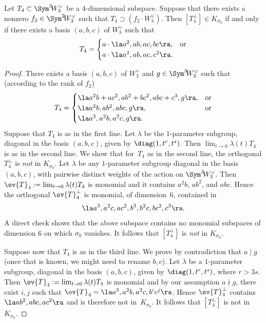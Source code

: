 \begin{prop}\label{gary}
Let $T_4\subset \Sym^3 \!W^{\vee}_3$ be a $4$-dimensional subspace. Suppose that there exists a nonzero $f_2\in\Sym^2\! W_3^{\vee}$ such that $T_4\supset (f_2\cdot W_3^{\vee})$. Then $[T_4^{\bot}]\in K_{\sigma_0}$ if and only if there exists a basis $(a,b,c)$ of $W^{\vee}_3$ such that
\begin{equation}
T_4=
\begin{cases}
a\cdot\la a^2, ab,ac,bc\ra,& \text{or}\\
a\cdot\la a^2,ab,ac,c^2\ra.
\end{cases}
\end{equation}
\end{prop}

\begin{proof}
There exists a basis $(a,b,c)$ of $W^{\vee}_3$ and $g\in\Sym^3 \!W^{\vee}_3$ such that (according to the rank of $f_2$)
\begin{equation}
T_4=
\begin{cases}
\la a^2b +ac^2,ab^2+bc^2,abc+c^3,g\ra,& \text{or}\\
\la a^2b,ab^2,abc,g\ra,& \text{or}\\
\la a^3,a^2b,a^2c,g\ra.
\end{cases}
\end{equation}
Suppose that $T_4$ is as in the first line. Let $\lambda$ be the $1$-parameter subgroup, diagonal in the basis $(a,b,c)$, given by $\diag(1,t^r,t^s)$. Then
$\lim_{t\to 0}\lambda(t)T_4$ is as in the second line. We show that for~$T_4$ as in the second line, the orthogonal $T_4^{\bot}$ is \emph{not} in $K_{\sigma_0}$. Let $\lambda$ be any $1$-parameter subgroup
diagonal in the basis $(a,b,c)$, with pairwise distinct weights of the action on $\Sym^3 \!W^{\vee}_3$. Then $\ov{T}_4:=\lim_{t\to 0}\lambda(t)T_4$ is monomial and it contains $a^2b$, $ab^2$, and $abc$. Hence the orthogonal $ \ov{T}_4 ^{\bot}$ is monomial, of dimension~$6$, contained in
\[
\la a^3,a^2c,ac^2,b^3,b^2c,bc^2,c^3\ra.
\]
A direct check shows that the above subspace contains no monomial subspaces of dimension $6$ on which $\sigma_0$ vanishes. It follows that $[T_4^{\bot}]$ is \emph{not} in $K_{\sigma_0}$.

Suppose now that $T_4$ is as in the third line. We prove by contradiction that $a\mid g$ (once that is known, we might need to rename $b,c$).
Let $\lambda$ be a $1$-parameter subgroup, diagonal in the basis $(a,b,c)$, given by $\diag(1,t^r,t^s)$, where $r>3s$.
Then \hbox{$\ov{T}_4:=\lim_{t\to 0}\lambda(t)T_4$} is monomial and by our assumption $a\nmid g$, there exist $i,j$ such that
$\ov{T}_4=\la a^3,a^2b,a^2c,b^i c^j\ra$. Hence $ \ov{T}_4 ^{\bot}$ contains $\la ab^2,abc,ac^2\ra$ and is therefore not in~$K_{\sigma_0}$. It follows that $[T_4^{\bot}]$ is not in $K_{\sigma_0}$.
\end{proof}

